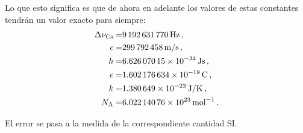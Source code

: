 \begin{frame}
Lo que esto significa es que de ahora en adelante los valores de estas constantes tendrán un valor exacto para siempre:
\begin{align*}
    \Delta\nu_{\text{Cs}}=& \SI{9 192 631 770}{Hz}\,,\\
    c=&\SI{ 299 792 458 }{m/s}\,,\\
    h=&\SI{ 6.62607015E-34 }{J s}\,,\\
     e=&\SI{1.602 176 634E-19}{C}\,,\\
     k=&\SI{1.380 649E-23}{J/K}\,,\\ 
     N_{\text{A}}=&\SI{6.022 140 76E23}{mol^{-1}}\,.  
\end{align*}

El error se pasa a la medida de la correspondiente cantidad SI.
\end{frame}

